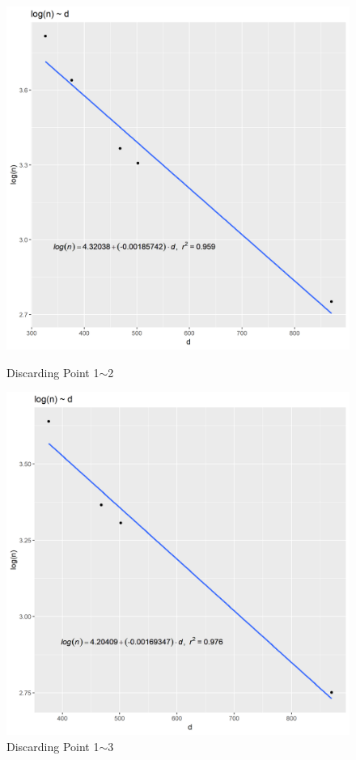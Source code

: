 \documentclass{article}
\begin{document}
            \begin{figure}[H]
                \begin{minipage}[t]{0.5\textwidth}
                    \centering
                    \includegraphics[width = 0.8\linewidth]{../Data/discard_3.png}
                    \caption{Discarding Point 1$\sim$2}
                    \label{dis.2}
                \end{minipage}
                \begin{minipage}[t]{0.5\textwidth}
                    \centering
                    \includegraphics[width = 0.8\linewidth]{../Data/discard_4.png}
                    \caption{Discarding Point 1$\sim$3}
                    \label{dis.3}
                \end{minipage}
            \end{figure}
\end{document}
